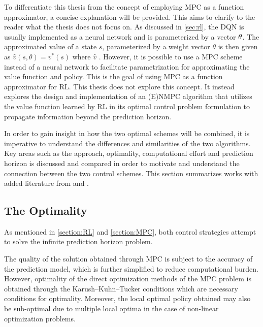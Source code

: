 To differentiate this thesis from the concept of employing MPC as a function approximator, a concise explanation will be provided. This aims to clarify to the reader what the thesis does not focus on. As discussed in \autoref{sec:rl}, the DQN is usually implemented as a neural network and is parameterized by a vector $\bold{\theta}$. The approximated value of a state $s$, parameterized by a weight vector  $\theta$ is then given as $ \hat{v}(s,\theta) = v^*(s)$ where $\hat{v}$ \cite{lubbersAutonomousGreenhouseClimate2023}. However, it is possible to use a MPC scheme instead of a neural network to facilitate parametrization for approximating the value function and policy. This is the goal of using MPC as a function approximator for RL. This thesis does not explore this concept. It instead explores the design and implementation of an (E)NMPC algorithm that utilizes the value function learned by RL in its optimal control problem formulation to propagate information beyond the prediction horizon. 

In order to gain insight in how the two optimal schemes will be combined, it is imperative to understand the differences and similarities of the two algorithms. Key areas such as the approach, optimality, computational effort and prediction horizon is discussed and compared in order to motivate and understand the connection between the two control schemes. This section summarizes \cite{arroyoReinforcedModelPredictive2022} works with added literature from \cite{bertsekasNewtonMethodReinforcement2022} and \cite{linReinforcementLearningBasedModel2023}.

\subsection{The Optimality}
As mentioned in \autoref{section:RL} and \autoref{section:MPC}, both control strategies attempt to solve the infinite prediction horizon problem.

The quality of the solution obtained through MPC is subject to the accuracy of the prediction model, which is further simplified to reduce computational burden. However, optimality of the direct optimization methods of the MPC problem is obtained through the Karush–Kuhn–Tucker conditions which are necessary conditions for optimality. Moreover, the local optimal policy obtained may also be sub-optimal due to multiple local optima in the case of non-linear optimization problems.

